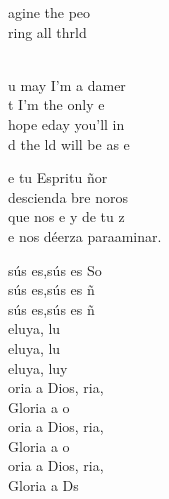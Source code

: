 \documentclass[12pt]{article}
\begin{document}
\begin{multicols*}{2}
\begin{cancion}
\begin{chorus}
	agine  the peo\\
	ring all thrld\\
	\end{chorus}%
	\jump\\
	u may  I'm a damer \\
	t I'm  the only e  \\
	hope eday you'll in \\
	d the ld will be as e\\
\end{cancion}%

\begin{cancion}%
	e tu Espritu ñor\\
	descienda bre noros   \\
	que nos e y de tu z  \\
	e nos déerza paraaminar.\\
\end{cancion}%

\begin{cancion}%
	sús es,sús es So\\
	sús es,sús es ñ \\
	sús es,sús es ñ\\
	eluya, lu  \\
	eluya, lu  \\
	eluya, luy  \\
	oria a Dios, ria, \\
	Gloria a o\\
	oria a Dios, ria, \\
	Gloria a o \\
	oria a Dios, ria, \\
	Gloria a Ds\\
\end{cancion}%


\end{multicols*}
\end{document}
